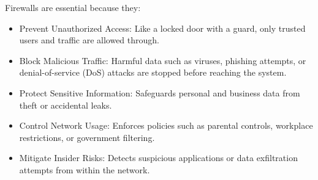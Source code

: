 Firewalls are essential because they:
\begin{itemize}
    \item Prevent Unauthorized Access: Like a locked door with a guard, only trusted users and traffic are allowed through.
    \item Block Malicious Traffic: Harmful data such as viruses, phishing attempts, or denial-of-service (DoS) attacks are stopped before reaching the system.
    \item Protect Sensitive Information: Safeguards personal and business data from theft or accidental leaks.
    \item Control Network Usage: Enforces policies such as parental controls, workplace restrictions, or government filtering.
    \item Mitigate Insider Risks: Detects suspicious applications or data exfiltration attempts from within the network.
\end{itemize} 


